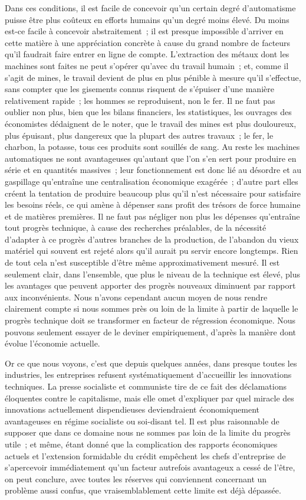 \documentclass[french,twoside]{book} %
\begin{document}
Dans ces conditions, il est facile de concevoir qu'un certain degré d'automatisme puisse être plus coûteux en efforts humains qu'un degré moins élevé. Du moins est-ce facile à concevoir abstraitement ; il est presque impossible d'arriver en cette matière à une appréciation concrète à cause du grand nombre de facteurs qu'il faudrait faire entrer en ligne de compte. L'extraction des métaux dont les machines sont faites ne peut s'opérer qu'avec du travail humain ; et, comme il s'agit de mines, le travail devient de plus en plus pénible à mesure qu'il s'effectue, sans compter que les gisements connus risquent de s'épuiser d'une manière relativement rapide ; les hommes se reproduisent, non le fer. Il ne faut pas oublier non plus, bien que les bilans financiers, les statistiques, les ouvrages des économistes dédaignent de le noter, que le travail des mines est plus douloureux, plus épuisant, plus dangereux que la plupart des autres travaux ; le fer, le charbon, la potasse, tous ces produits sont souillés de sang. Au reste les machines automatiques ne sont avantageuses qu'autant que l'on s'en sert pour produire en série et en quantités massives ; leur fonctionnement est donc lié au désordre et au gaspillage qu'entraîne une centralisation économique exagérée ; d'autre part elles créent la tentation de produire beaucoup plus qu'il n'est nécessaire pour satisfaire les besoins réels, ce qui amène à dépenser sans profit des trésors de force humaine et de matières premières. Il ne faut pas négliger non plus les dépenses qu'entraîne tout progrès technique, à cause des recherches préalables, de la nécessité d'adapter à ce progrès d'autres branches de la production, de l'abandon du vieux matériel qui souvent est rejeté alors qu'il aurait pu servir encore longtemps. Rien de tout cela n'est susceptible d'être même approximativement mesuré. Il est seulement clair, dans l'ensemble, que plus le niveau de la technique est élevé, plus les avantages que peuvent apporter des progrès nouveaux diminuent par rapport aux inconvénients. Nous n'avons cependant aucun moyen de nous rendre clairement compte si nous sommes près ou loin de la limite à partir de laquelle le progrès technique doit se transformer en facteur de régression économique. Nous pouvons seulement essayer de le deviner empiriquement, d'après la manière dont évolue l'économie actuelle.\par
Or ce que nous voyons, c'est que depuis quelques années, dans presque toutes les industries, les entreprises refusent systématiquement d'accueillir les innovations techniques. La presse socialiste et communiste tire de ce fait des déclamations éloquentes contre le capitalisme, mais elle omet d'expliquer par quel miracle des innovations actuellement dispendieuses deviendraient économiquement avantageuses en régime socialiste ou soi-disant tel. Il est plus raisonnable de supposer que dans ce domaine nous ne sommes pas loin de la limite du progrès utile ; et même, étant donné que la complication des rapports économiques actuels et l'extension formidable du crédit empêchent les chefs d'entreprise de s'apercevoir immédiatement qu'un facteur autrefois avantageux a cessé de l'être, on peut conclure, avec toutes les réserves qui conviennent concernant un problème aussi confus, que vraisemblablement cette limite est déjà dépassée.\par
\end{document}
